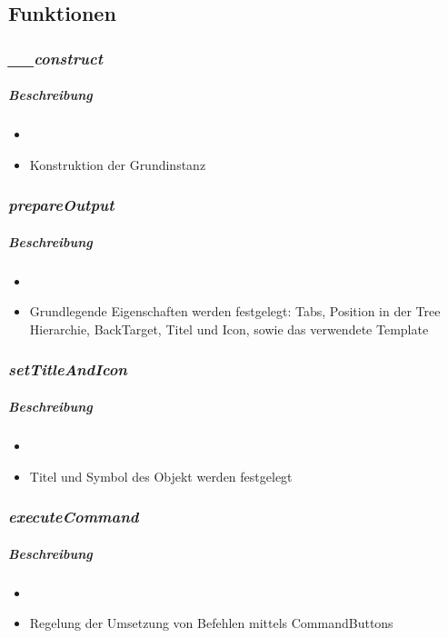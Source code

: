 \subsection*{Funktionen}

\subsubsection*{\textit{\_\_construct}}\label{constructGDGUI}
\subparagraph{Beschreibung}
\begin{itemize}
	\item[] \noindent{}
	\item[] Konstruktion der Grundinstanz
\end{itemize}

\subsubsection*{\textit{prepareOutput}}\label{prepareOutputGDGUI}
\subparagraph{Beschreibung}
\begin{itemize}
	\item[] \noindent{}
	\item[] Grundlegende Eigenschaften werden festgelegt: Tabs, Position in der Tree Hierarchie, BackTarget, Titel und Icon, sowie das verwendete Template
\end{itemize}

\subsubsection*{\textit{setTitleAndIcon}}\label{setTitleAndIconGDGUI}
\subparagraph{Beschreibung}
\begin{itemize}
	\item[] \noindent{}
	\item[] Titel und Symbol des Objekt werden festgelegt
\end{itemize}

\subsubsection*{\textit{executeCommand}}\label{executeCommandGDGUI}
\subparagraph{Beschreibung}
\begin{itemize}
	\item[] \noindent{}
	\item[] Regelung der Umsetzung von Befehlen mittels CommandButtons
\end{itemize}

